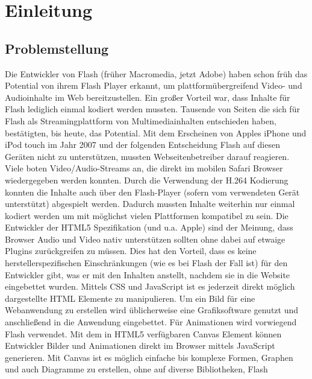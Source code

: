 \chapter{Einleitung}
\section{Problemstellung}
Die Entwickler von Flash (früher Macromedia, jetzt Adobe) haben schon früh das
Potential von ihrem Flash Player erkannt, um plattformübergreifend Video- und
Audioinhalte im Web bereitzustellen. Ein großer Vorteil war, dass Inhalte für
Flash lediglich einmal kodiert werden mussten. Tausende von Seiten die sich für
Flash als Streamingplattform von Multimediainhalten entschieden haben,
bestätigten, bis heute, das Potential.
\newline\newline
Mit dem Erscheinen von Apples iPhone und iPod touch im Jahr 2007 und der
folgenden Entscheidung Flash auf diesen Geräten nicht zu unterstützen, mussten
Webseitenbetreiber darauf reagieren. Viele boten Video/Audio-Streams an, die
direkt im mobilen Safari Browser wiedergegeben werden konnten. Durch die
Verwendung der H.264 Kodierung konnten die Inhalte auch über den Flash-Player
(sofern vom verwendeten Gerät unterstützt) abgespielt werden. Dadurch mussten
Inhalte weiterhin nur einmal kodiert werden um mit möglichst vielen Plattformen
kompatibel zu sein.
\newline\newline
Die Entwickler der HTML5 Spezifikation (und u.a. Apple) sind der Meinung, dass
Browser Audio und Video nativ unterstützen sollten ohne dabei auf etwaige
Plugins zurückgreifen zu müssen. Dies hat den Vorteil, dass es keine
herstellerspezifischen Einschränkungen (wie es bei Flash der Fall ist) für den
Entwickler gibt, was er mit den Inhalten anstellt, nachdem sie in die Website
eingebettet wurden. Mittels CSS und JavaScript ist es jederzeit direkt möglich
dargestellte HTML Elemente zu manipulieren.
\newline\newline
Um ein Bild für eine Webanwendung zu erstellen wird üblicherweise eine
Grafiksoftware genutzt und anschließend in die Anwendung eingebettet. Für
Animationen wird vorwiegend Flash verwendet. Mit dem in HTML5 verfügbaren Canvas
Element können Entwickler Bilder und Animationen direkt im Browser mittels
JavaScript generieren. Mit Canvas ist es möglich einfache bis komplexe Formen,
Graphen und auch Diagramme zu erstellen, ohne auf diverse Bibliotheken, Flash

